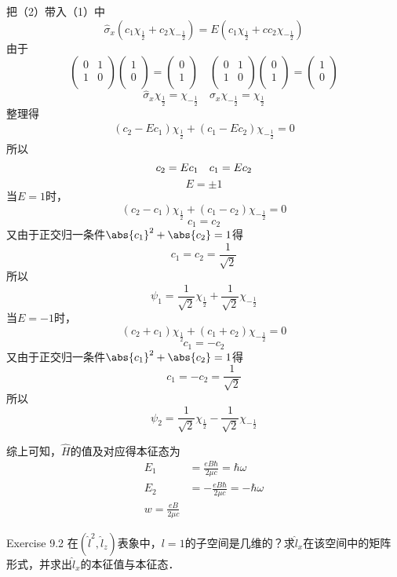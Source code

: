 把（2）带入（1）中
$$
\hat{\sigma}_x\left( c_1\chi _{\frac{1}{2}}+c_2\chi _{-\frac{1}{2}} \right) =E\left( c_1\chi _{\frac{1}{2}}+cc_2\chi _{-\frac{1}{2}} \right)
$$
由于
$$
\left( \begin{matrix}{}
	0&		1\\
	1&		0\\
\end{matrix} \right) \left( \begin{array}{l}
	1\\
	0\\
\end{array} \right) =\left( \begin{array}{l}
	0\\
	1\\
\end{array} \right) \quad \left( \begin{matrix}{}
	0&		1\\
	1&		0\\
\end{matrix} \right) \left( \begin{array}{l}
	0\\
	1\\
\end{array} \right) =\left( \begin{array}{l}
	1\\
	0\\
\end{array} \right) 
$$
$$
\hat{\sigma}_x\chi _{\frac{1}{2}}=\chi _{-\frac{1}{2}}\quad \hat{\sigma}_x\chi _{-\frac{1}{2}}=\chi _{\frac{1}{2}}
$$
整理得
\begin{align}
\left( c_2-Ec_1 \right) \chi _{\frac{1}{2}}+\left( c_1-Ec_2 \right) \chi _{-\frac{1}{2}}=0
\end{align}
所以
$$
c_2=Ec_1\quad	c_1=Ec_2\\
$$
$$E=\pm 1$$
当$E=1$时，
$$
\left( c_2-c_1 \right) \chi _{\frac{1}{2}}+\left( c_1-c_2 \right) \chi _{-\frac{1}{2}}=0$$$$
c_1=c_2
$$
又由于正交归一条件$\abs{c_1}^2+\abs{c_2}=1$得
$$
c_1=c_2=\frac{1}{\sqrt{2}}
$$
所以
$$
\psi_1=\frac{1}{\sqrt{2}}\chi _{\frac{1}{2}}+\frac{1}{\sqrt{2}}\chi _{-\frac{1}{2}}
$$
当$E=-1$时，
$$
\left( c_2+c_1 \right) \chi _{\frac{1}{2}}+\left( c_1+c_2 \right) \chi _{-\frac{1}{2}}=0$$$$
c_1=-c_2
$$
又由于正交归一条件$\abs{c_1}^2+\abs{c_2}=1$得
$$
c_1=-c_2=\frac{1}{\sqrt{2}}
$$
所以
$$
\psi_2=\frac{1}{\sqrt{2}}\chi _{\frac{1}{2}}-\frac{1}{\sqrt{2}}\chi _{-\frac{1}{2}}
$$

综上可知，$\hat{H}$的值及对应得本征态为
\begin{align}
E_1&=\frac{eB\hbar}{2\mu c}=\hbar \omega\\
E_2&=-\frac{eB\hbar}{2\mu c}=-\hbar \omega\\
w=\frac{eB}{2\mu c}
\end{align}

Exercise 9.2 在$(\hat{l}^2,\hat{l}_z)$表象中，$l=1$的子空间是几维的？求$\hat{l}_x$在该空间中的矩阵形式，并求出$\hat{l}_x$的本征值与本征态．